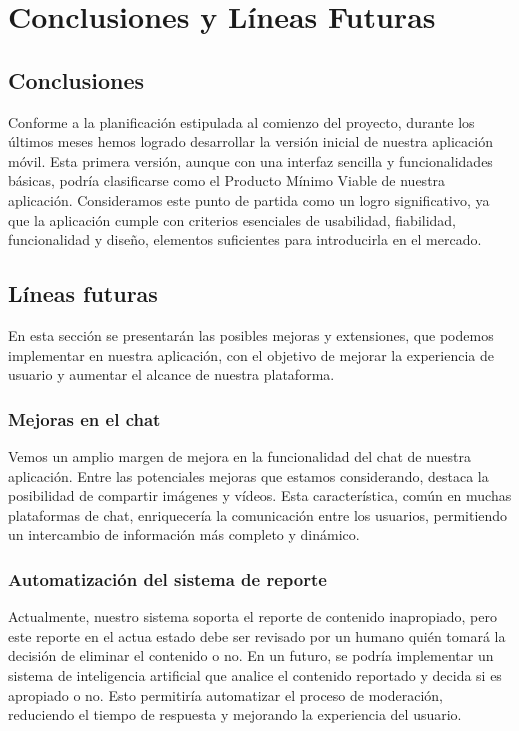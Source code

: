 \chapter{Conclusiones y Líneas Futuras}
    \section{Conclusiones}
        Conforme a la planificación estipulada al comienzo del proyecto, durante los últimos meses hemos logrado desarrollar la versión inicial de nuestra aplicación móvil. Esta primera versión, aunque con una interfaz sencilla y funcionalidades básicas, podría clasificarse como el Producto Mínimo Viable\cite{REF6} de nuestra aplicación. Consideramos este punto de partida como un logro significativo, ya que la aplicación cumple con criterios esenciales de usabilidad, fiabilidad, funcionalidad y diseño, elementos suficientes para introducirla en el mercado.

        \section{Líneas futuras}
            En esta sección se presentarán las posibles mejoras y extensiones, que podemos implementar en nuestra aplicación, con el objetivo de mejorar la experiencia de usuario y aumentar el alcance de nuestra plataforma.
  
        \subsection{Mejoras en el chat}
            Vemos un amplio margen de mejora en la funcionalidad del chat de nuestra aplicación. Entre las potenciales mejoras que estamos considerando, destaca la posibilidad de compartir imágenes y vídeos. Esta característica, común en muchas plataformas de chat, enriquecería la comunicación entre los usuarios, permitiendo un intercambio de información más completo y dinámico.
            
        \subsection{Automatización del sistema de reporte}
            Actualmente, nuestro sistema soporta el reporte de contenido inapropiado, pero este reporte en el actua estado debe ser revisado por un humano quién tomará la decisión de eliminar el contenido o no. En un futuro, se podría implementar un sistema de inteligencia artificial que analice el contenido reportado y decida si es apropiado o no. Esto permitiría automatizar el proceso de moderación, reduciendo el tiempo de respuesta y mejorando la experiencia del usuario.

